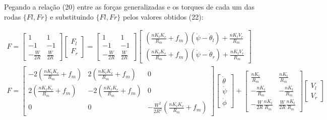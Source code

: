 \documentclass[10pt]{article}
\begin{document}
\quad Pegando a relação (20) entre as forças generalizadas e os torques de
cada um das rodas $\{Fl,Fr\}$ e substituindo $\{Fl,Fr\}$ pelos valores obtidos (22):

\begin{equation}
\begin{gathered}
    F =
    \begin{bmatrix}
        1 & 1 \\
        -1 & -1 \\
        -\frac{W}{2R} & \frac{W}{2R}
    \end{bmatrix}
    \begin{bmatrix}
        F_l \\
        F_r
    \end{bmatrix} =
    \begin{bmatrix}
        1 & 1 \\
        -1 & -1 \\
        -\frac{W}{2R} & \frac{W}{2R}
    \end{bmatrix}
    \begin{bmatrix}
        \left(\frac{nK_tK_e}{R_m} + f_m\right)(\dot\psi - \dot\theta_l) + \frac{nK_tV_r}{R_m} \\
        \left(\frac{nK_tK_e}{R_m} + f_m\right)(\dot\psi - \dot\theta_r) + \frac{nK_tV_r}{R_m}
    \end{bmatrix} \\
    F =
    \begin{bmatrix}
        -2\left(\frac{nK_tK_e}{R_m} + f_m\right) & 2\left(\frac{nK_tK_e}{R_m} + f_m\right) & 0 \\
        2\left(\frac{nK_tK_e}{R_m} + f_m\right) & -2\left(\frac{nK_tK_e}{R_m} + f_m\right) & 0 \\
        0 & 0 & - \frac{W^2}{2R^2} \left(\frac{nK_tK_e}{R_m} + f_m\right)
    \end{bmatrix}
    \begin{bmatrix} \dot\theta \\ \dot\psi \\ \dot\phi \end{bmatrix}
    +
    \begin{bmatrix}
        \frac{nK_t}{R_m} & \frac{nK_t}{R_m} \\
        -\frac{nK_t}{R_m} & -\frac{nK_t}{R_m} \\
        -\frac{W}{2R}\frac{nK_t}{R_m} & \frac{W}{2R}\frac{nK_t}{R_m}
    \end{bmatrix}
    \begin{bmatrix}
        V_l \\ V_r
    \end{bmatrix}
\end{gathered}
\end{equation}
\end{document}
